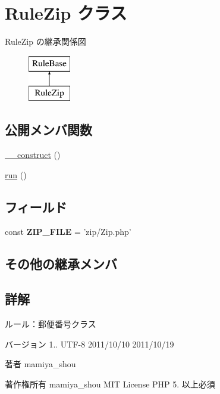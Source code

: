 \hypertarget{class_rule_zip}{\section{Rule\+Zip クラス}
\label{class_rule_zip}
}
Rule\+Zip の継承関係図\begin{figure}[H]
\begin{center}
\leavevmode
\includegraphics[height=2.000000cm]{class_rule_zip}
\end{center}
\end{figure}
\subsection*{公開メンバ関数}
\begin{DoxyCompactItemize}
\item 
\hyperlink{class_rule_zip_a095c5d389db211932136b53f25f39685}{\+\_\+\+\_\+construct} ()
\item 
\hyperlink{class_rule_zip_afb0fafe7e02a3ae1993c01c19fad2bae}{run} ()
\end{DoxyCompactItemize}
\subsection*{フィールド}
\begin{DoxyCompactItemize}
\item 
\hypertarget{class_rule_zip_ab168cbeba579bbfed03fe9f7b039d3ee}{const {\bfseries Z\+I\+P\+\_\+\+F\+I\+L\+E} = 'zip/Zip.\+php'}\label{class_rule_zip_ab168cbeba579bbfed03fe9f7b039d3ee}

\end{DoxyCompactItemize}
\subsection*{その他の継承メンバ}


\subsection{詳解}
ルール：郵便番号クラス

\begin{DoxyVersion}{バージョン}
1..  U\+T\+F-\/8  2011/10/10  2011/10/19 
\end{DoxyVersion}
\begin{DoxyAuthor}{著者}
mamiya\+\_\+shou 
\end{DoxyAuthor}
\begin{DoxyCopyright}{著作権所有}
mamiya\+\_\+shou  M\+I\+T License  P\+H\+P 5. 以上必須 
\end{DoxyCopyright}



